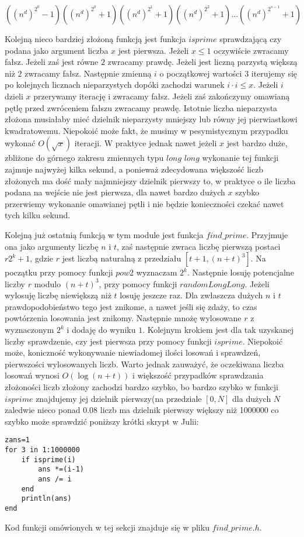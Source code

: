 \documentclass{article}
\begin{document}
$$((n^d)^{2^0}-1)((n^d)^{2^0}+1)((n^d)^{2^1}+1)((n^d)^{2^2}+1)...((n^d)^{2^{s-1}}+1) $$


Kolejną nieco bardziej złożoną funkcją jest funkcja $isprime$ sprawdzającą czy podana jako argument 
liczba $x$ jest pierwsza. Jeżeli $x \leq 1$ oczywiście zwracamy fałsz. Jeżeli zaś jest równe $2$ zwracamy
prawdę. Jeżeli jest liczną parzystą większą niż $2$ zwracamy fałsz. Następnie zmienną $i$ o początkowej wartości $3$ 
iterujemy się po kolejnych licznach nieparzystych dopóki zachodzi warunek $i \cdot i \leq x$.
Jeżeli $i$ dzieli $x$ przerywamy iterację i zwracamy fałsz. Jeżeli zaś zakończymy omawianą pętlę przed zwróceniem fałszu
zwracamy prawdę. Istotnie liczba nieparzysta złożona musiałaby mieć dzielnik nieparzysty mniejszy lub równy jej
pierwiastkowi kwadratowemu. Niepokoić może fakt, że musimy w pesymistycznym przypadku wykonać $O(\sqrt{x})$ iteracji.
W praktyce jednak nawet jeżeli $x$ jest bardzo duże, zbliżone do górnego zakresu zmiennych typu $long$ $long$ 
wykonanie tej funkcji zajmuje najwyżej kilka sekund, a ponieważ zdecydowana większość liczb złożonych ma 
dość mały najmniejszy dzielnik pierwszy to, w praktyce o ile liczba podana na wejście nie jest pierwsza, dla nawet bardzo dużych $x$ szybko przerwiemy wykonanie omawianej pętli i nie będzie konieczności czekać nawet tych kilku sekund.

Kolejną już ostatnią funkcją w tym module jest funkcja $find\_prime$. Przyjmuje ona jako argumenty liczbę $n$ i $t$, zaś następnie zwraca liczbę pierwszą postaci $r2^k+1$, gdzie $r$ jest liczbą naturalną z przedziału $[t+1,(n+t)^3]$. Na początku przy pomocy funkcji $pow2$ wyznaczam $2^k$. Następnie losuję potencjalne liczby $r$ modulo $(n+t)^3$, przy pomocy
funkcji $randomLongLong$. Jeżeli wylosuję liczbę niewiększą niż $t$ losuję jeszcze raz. Dla zwłaszcza dużych $n$ i $t$
prawdopodobieństwo tego jest znikome, a nawet jeśli się zdaży, to czas powtórzenia losowania jest znikomy. Następnie mnożę
wylosowane $r$ z wyznaczonym $2^k$ i dodaję do wyniku $1$. Kolejnym krokiem jest dla tak uzyskanej liczby sprawdzenie, czy 
jest pierwsza przy pomocy funkcji $isprime$. Niepokoić może, koniczność wykonywanie niewiadomej ilości losowań i sprawdzeń, pierwszości wylosowanych liczb. Warto jednak zauważyć, że oczekiwana liczba losowań wynosi $O(\log(n+t))$ i większość przypadków sprawdzania złożoności liczb złożony zachodzi bardzo szybko, bo bardzo szybko w funkcji $isprime$ znajdujemy jej dzielnik pierwszy(na przedziale $[0,N]$ dla dużych $N$ zaledwie nieco ponad $0.08$ liczb ma dzielnik pierwszy większy niż 1000000 co szybko może sprawdzić poniższy krótki skrypt w Julii:
\begin{lstlisting}
zans=1
for 3 in 1:1000000
    if isprime(i)
        ans *=(i-1)
        ans /= i
    end 
    println(ans)
end
\end{lstlisting}
Kod funkcji omówionych w tej sekcji znajduje się w pliku $find\_prime.h$.
\end{document}
